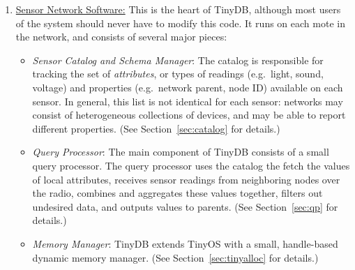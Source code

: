 \documentclass[11pt]{article}
\begin{document}
\begin{enumerate}
\item \underline{Sensor Network Software:}  This is the heart of TinyDB, although most users of
the system should never have to modify this code.  It runs on each
mote in the network, and consists of several major pieces:
\begin{itemize}
\item {\it Sensor Catalog and Schema Manager}:  The catalog is responsible for tracking the
set of {\it attributes}, or types of readings
(e.g.\ light, sound, voltage) and
properties (e.g.\ network parent, node ID) available
on each sensor.  In general, this list is not identical for each sensor:  networks may consist
of heterogeneous collections of devices, and may be able to report
different properties.  (See
Section~\ref{sec:catalog} for details.)

\item {\it Query Processor}: The main
component of TinyDB consists of a small
query processor.  The query
processor uses the catalog the
fetch the values of local attributes, receives
sensor readings from neighboring
nodes over the radio, combines and
aggregates these values together,
filters out undesired data, and outputs values to
parents.  (See Section~\ref{sec:qp} for details.)

\item {\it Memory Manager}:  TinyDB extends TinyOS with a small, handle-based
  dynamic memory manager.  (See Section~\ref{sec:tinyalloc} for details.)


\end{itemize}
\end{enumerate}
\end{document}
